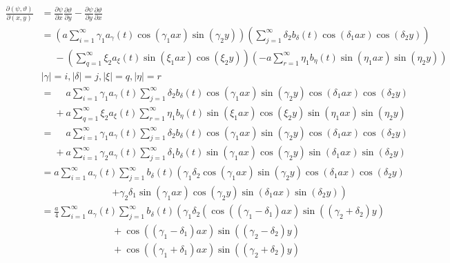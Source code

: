 \begin{align*}
\frac{\partial(\psi, \vartheta)}{\partial(x,y)}
&=
\frac{\partial\psi}{\partial x}
\frac{\partial\vartheta}{\partial y}
-
\frac{\partial\psi}{\partial y}
\frac{\partial\vartheta}{\partial x}
\\
&=
\left(
a
\sum_{i = 1}^{\infty}
\gamma_1
a_{\gamma}(t)
\cos(\gamma_1 ax) \sin(\gamma_2 y)
\right)
\left(
\sum_{j = 1}^{\infty}
\delta_2
b_{\delta}(t)
\cos(\delta_1 ax) \cos(\delta_2 y)
\right)
\\
&\phantom{={}}
-
\left(
\sum_{q = 1}^{\infty}
\xi_2
a_{\xi}(t)
\sin(\xi_1 ax) \cos(\xi_2 y)
\right)
\left(
-
a
\sum_{r = 1}^{\infty}
\eta_1
b_{\eta}(t)
\sin(\eta_1 ax) \sin(\eta_2 y)
\right)
\\
&|\gamma| = i, |\delta| = j, |\xi| = q, |\eta| = r
\\
&=\phantom{+}
a
\sum_{i = 1}^{\infty}
\gamma_1
a_{\gamma}(t)
\sum_{j = 1}^{\infty}
\delta_2
b_{\delta}(t)
\cos(\gamma_1 ax) \sin(\gamma_2 y)
\cos(\delta_1 ax) \cos(\delta_2 y)
\\
&\phantom{={}}
+
a
\sum_{q = 1}^{\infty}
\xi_2
a_{\xi}(t)
\sum_{r = 1}^{\infty}
\eta_1
b_{\eta}(t)
\sin(\xi_1 ax) \cos(\xi_2 y)
\sin(\eta_1 ax) \sin(\eta_2 y)
\\
&=\phantom{+}
a
\sum_{i = 1}^{\infty}
\gamma_1
a_{\gamma}(t)
\sum_{j = 1}^{\infty}
\delta_2
b_{\delta}(t)
\cos(\gamma_1 ax) \sin(\gamma_2 y)
\cos(\delta_1 ax) \cos(\delta_2 y)
\\
&\phantom{={}}
+
a
\sum_{i = 1}^{\infty}
\gamma_2
a_{\gamma}(t)
\sum_{j = 1}^{\infty}
\delta_1
b_{\delta}(t)
\sin(\gamma_1 ax) \cos(\gamma_2 y)
\sin(\delta_1 ax) \sin(\delta_2 y)
\\
&=
a
\sum_{i = 1}^{\infty}
a_{\gamma}(t)
\sum_{j = 1}^{\infty}
b_{\delta}(t)
\left(
\gamma_1 \delta_2
\cos(\gamma_1 ax) \sin(\gamma_2 y)
\cos(\delta_1 ax) \cos(\delta_2 y)
\right.
\\[-2.5ex]
&\phantom{=abbb\sum\sum.....{}}
\left.
+
\gamma_2 \delta_1
\sin(\gamma_1 ax) \cos(\gamma_2 y)
\sin(\delta_1 ax) \sin(\delta_2 y)
\right)	
\\
&=
\frac{a}{4}
\sum_{i = 1}^{\infty}
a_{\gamma}(t)
\sum_{j = 1}^{\infty}
b_{\delta}(t)
\left(
\gamma_1 \delta_2
\left(
\cos((\gamma_1 - \delta_1)ax)\sin((\gamma_2 + \delta_2)y)
\right.
\right.
\\[-2.5ex]
&\phantom{=abbb\sum\sum.....{}}
+\cos((\gamma_1 - \delta_1)ax)\sin((\gamma_2 - \delta_2)y)
\\[-1.0ex]
&\phantom{=abbb\sum\sum.....{}}
+\cos((\gamma_1 + \delta_1)ax)\sin((\gamma_2 + \delta_2)y)

\end{align*}
